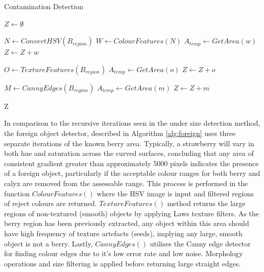 \documentclass[fleqn,twoside,12pt]{report}
\begin{document}
\begin{algorithm}
	\caption{Contamination Detection}
	\label{alg:foreign}
	\begin{algorithmic}[1]
		\State $Z \gets \emptyset$
		
		\State $N \gets ConvertHSV(B_{region})$
		\State $ W \gets ColourFeatures(N)$
			\State $A_{temp} \gets GetArea(w)$
				\State $Z \gets Z + w$
			\EndIf
		\EndFor
			
		
		\State $O \gets TextureFeatures(B_{region})$
			\State $A_{temp} \gets GetArea(o)$
				\State $Z \gets Z + o$
			\EndIf
		\EndFor
		
		
		\State $M\gets CannyEdges(B_{region})$
			\State $A_{temp} \gets GetArea(m)$
				\State $Z \gets Z + m$
			\EndIf
		\EndFor
		
		
		\State \Return Z
		\EndProcedure
	\end{algorithmic}
\end{algorithm}


In comparison to the recursive iterations seen in the under size detection method, the foreign object detector, described in Algorithm \ref{alg:foreign} uses three separate iterations of the known berry area. Typically, a strawberry will vary in both hue and saturation across the curved surfaces, concluding that any area of consistent gradient greater than approximately 5000 pixels indicates the presence of a foreign object, particularly if the acceptable colour ranges for both berry and calyx are removed from the assessable range. This process is performed in the function $ColourFeatures()$ where the HSV image is input and filtered regions of reject colours are returned. $TextureFeatures()$ method returns the large regions of non-textured (smooth) objects by applying Laws texture filters. As the berry region has been previously extracted, any object within this area should have high frequency of texture artefacts (seeds), implying any large, smooth object is not a berry. Lastly, $CannyEdges()$ utilises the Canny edge detector for finding colour edges due to it's low error rate and low noise. Morphology operations and size filtering is applied before returning large straight edges. 
\end{document}
